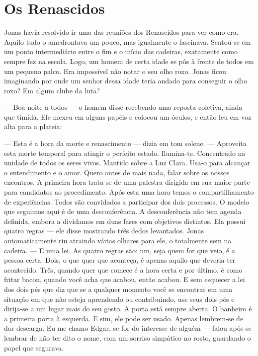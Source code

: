 \chapter{Os Renascidos}

Jonas havia resolvido ir uma das reuniões dos Renascidos para ver como era. Aquilo tudo o amedrontava um pouco, mas igualmente o fascinava. Sentou-se em um ponto intermediário entre o fim e o início das cadeiras, exatamente como sempre fez na escola. Logo, um homem de certa idade se pôs à frente de todos em um pequeno palco. Era impossível não notar o seu olho roxo. Jonas ficou imaginando por onde um senhor dessa idade teria andado para conseguir o olho roxo? Em algum clube da luta?

--- Boa noite a todos --- o homem disse recebendo uma reposta coletiva, ainda que tímida. Ele mexeu em alguns papéis e colocou um óculos, e então leu em voz alta para a plateia:

--- Esta é a hora da morte e renascimento --- dizia em tom solene. --- Aproveita esta morte temporal para atingir o perfeito estado. Ilumina-te. Concentrado na unidade de todos os seres vivos. Mantido sobre a Luz Clara. Usa-o para alcançar o entendimento e o amor. Quero antes de mais nada, falar sobre os nossos encontros. A primeira hora trata-se de uma palestra dirigida em sua maior parte para candidatos ao procedimento. Após esta uma hora temos o compartilhamento de experiências. Todos são convidados a participar dos dois processos. O modelo que seguimos aqui é de uma desconferência. A desconferência não tem agenda definida, embora a dividamos em duas fases com objetivos distintos. Ela possui quatro regras --- ele disse mostrando três dedos levantados. Jonas automaticamente riu\mudanca{,} atraindo várias olhares para ele, o  totalmente sem  na cadeira. --- E uma lei. As quatro regras são: um, seja quem for que veio, é a pessoa certa. Dois, o que quer que aconteça, é apenas aquilo que deveria ter acontecido. Três, quando quer que comece é a hora certa e por último, é como fritar bacon, quando você acha que acabou, então acabou. E sem esquecer a lei dos dois pés\mudanca{,} que diz que se a qualquer momento você se encontrar em uma situação em que não esteja aprendendo ou contribuindo, use seus dois pés e dirija-se a um lugar mais do seu gosto. A porta está sempre aberta. O banheiro é a primeira porta à esquerda. E sim, ele pode ser usado. Apenas lembrem-se de dar descarga. Eu me chamo Edgar, se for do interesse de alguém --- falou após se lembrar de não ter dito o nome, com um sorriso simpático no rosto, guardando o papel que segurava.


